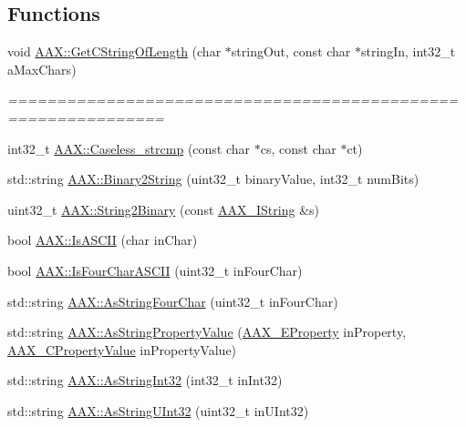 \subsection*{Functions}
\begin{DoxyCompactItemize}
\item 
void \mbox{\hyperlink{a00852_aa3db8a743884054a6ac1ec2c2495e86f}{A\+A\+X\+::\+Get\+C\+String\+Of\+Length}} (char $\ast$string\+Out, const char $\ast$string\+In, int32\+\_\+t a\+Max\+Chars)
\begin{DoxyCompactList}\small\item\em ============================================================== \end{DoxyCompactList}\item 
int32\+\_\+t \mbox{\hyperlink{a00852_a5f092aff54cbd222fda57f5ea0a12189}{A\+A\+X\+::\+Caseless\+\_\+strcmp}} (const char $\ast$cs, const char $\ast$ct)
\item 
std\+::string \mbox{\hyperlink{a00852_a690ffc499da04ea963fff3bf8d6174fb}{A\+A\+X\+::\+Binary2\+String}} (uint32\+\_\+t binary\+Value, int32\+\_\+t num\+Bits)
\item 
uint32\+\_\+t \mbox{\hyperlink{a00852_a7b02e5d4a96f72213f0d1e4b52e13050}{A\+A\+X\+::\+String2\+Binary}} (const \mbox{\hyperlink{a01873}{A\+A\+X\+\_\+\+I\+String}} \&s)
\item 
bool \mbox{\hyperlink{a00852_aa8ebc6a8ee1232c4ffec828bff3c2998}{A\+A\+X\+::\+Is\+A\+S\+C\+II}} (char in\+Char)
\item 
bool \mbox{\hyperlink{a00852_a00fbf59b268ca75214b2dad68be8ff77}{A\+A\+X\+::\+Is\+Four\+Char\+A\+S\+C\+II}} (uint32\+\_\+t in\+Four\+Char)
\item 
std\+::string \mbox{\hyperlink{a00852_a22eda3cc42cb4ea2192b00bab7a69b02}{A\+A\+X\+::\+As\+String\+Four\+Char}} (uint32\+\_\+t in\+Four\+Char)
\item 
std\+::string \mbox{\hyperlink{a00852_a1b3d4b5a967f01922963876447644b15}{A\+A\+X\+::\+As\+String\+Property\+Value}} (\mbox{\hyperlink{a00662_a13e384f22825afd3db6d68395b79ce0d}{A\+A\+X\+\_\+\+E\+Property}} in\+Property, \mbox{\hyperlink{a00392_ab247c0d8686c14e05cbb567ef276f249}{A\+A\+X\+\_\+\+C\+Property\+Value}} in\+Property\+Value)
\item 
std\+::string \mbox{\hyperlink{a00852_ab024a3d9ac9c68350b377b2c70ec4727}{A\+A\+X\+::\+As\+String\+Int32}} (int32\+\_\+t in\+Int32)
\item 
std\+::string \mbox{\hyperlink{a00852_ada4fd7cb0e04582a7615a76f6be7e404}{A\+A\+X\+::\+As\+String\+U\+Int32}} (uint32\+\_\+t in\+U\+Int32)

\end{DoxyCompactItemize}

